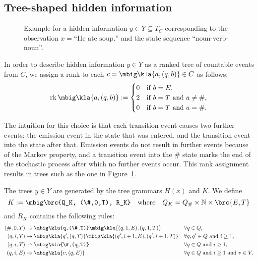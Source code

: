 \subsection{Tree-shaped hidden information}

\begin{figure}[t!]
 \centering
 \caption{Example for a hidden information $y\in Y\subseteq T_C$ corresponding
 to the observation $x = \text{``He ate soup.''}$ and the state sequence
 ``noun-verb-noun''.\label{fig:03-example-y}}
\end{figure}

In order to describe hidden information $y\in Y$ as a ranked tree of countable
events from $C$, we assign a rank to each $c = \mbig\kla{a,(q,b)}\in C$ as follows:
\begin{align*}
 \rk\mbig\kla{a,(q,b)} := \begin{cases}
  0 & \text{if } b = E, \\
  2 & \text{if } b = T \text{ and } a\neq\#, \\
  0 & \text{if } b = T \text{ and } a = \#.
 \end{cases}
\end{align*}

The intuition for this choice is that each transition event causes two further
events: the emission event in the state that was entered, and the transition
event into the state after that. Emission events do not result in further
events because of the Markov property, and a transition event into the $\#$
state marks the end of the stochastic process after which no further events
occur. This rank assignment results in trees such as the one in
Figure~\ref{fig:03-example-y}.

The trees $y\in Y$ are generated by the tree grammars $H(x)$ and $K$. We define
\[
 K := \mbig\brc{Q_K, (\#,0,T), R_K} \quad\text{where}\quad Q_K = Q_\# \times \zn \times \brc{E,T}
\]
and $R_K$ contains the following rules:
\begin{align*}
 (\#,0,T) &\to \mbig\kla{q,(\#,T)}\mbig\kla{(q,1,E),(q,1,T)} &&\forall q\in Q, \\
 (q,i,T) &\to \mbig\kla{q',(q,T)}\mbig\kla{(q',i+1,E),(q',i+1,T)} &&\forall q,q'\in Q \text{ and } i\geq1, \\
 (q,i,T) &\to \mbig\kla{\#,(q,T)} &&\forall q\in Q\text{ and } i\geq 1, \\
 (q,i,E) &\to \mbig\kla{v,(q,E)} &&\forall q\in Q\text{ and } i\geq 1 \text{ and } v\in V.
\end{align*}

